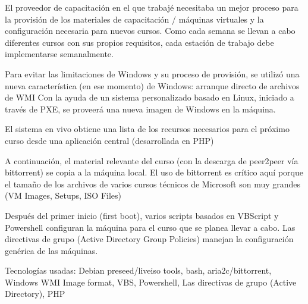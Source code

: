 \begin{cventries}
    {}
    {}
    {
      \begin{cvitems}
      \item  El proveedor de capacitación en el que trabajé necesitaba un mejor proceso para la provisión de
 los materiales de capacitación / máquinas virtuales y la configuración necesaria para nuevos
 cursos. Como cada semana se llevan a cabo diferentes cursos con sus propios requisitos, cada
 estación de trabajo debe implementarse semanalmente.
 \item  Para evitar las limitaciones de Windows y su proceso de provisión, se utilizó una nueva
 característica (en ese momento) de Windows: arranque directo de archivos de WMI
 Con la ayuda de un sistema personalizado basado en Linux, iniciado a través de PXE, se proveerá una nueva imagen de Windows en la máquina.
 \item El sistema en vivo obtiene una lista de los recursos necesarios para el próximo curso desde una aplicación central (desarrollada en PHP)
 \item A continuación, el material relevante del curso (con la descarga de peer2peer vía bittorrent) se
 copia a la máquina local. El uso de bittorrent es crítico aquí porque el tamaño de los archivos de
 varios cursos técnicos de Microsoft son muy grandes (VM Images, Setups, ISO Files)
 \item Después del primer inicio (first boot), varios scripts basados en VBScript y Powershell configuran
 la máquina para el curso que se planea llevar a cabo. Las directivas de grupo (Active Directory
 Group Policies) manejan la configuración genérica de las máquinas.
 \item Tecnologías usadas: Debian preseed/liveiso tools, bash, aria2c/bittorrent, Windows WMI Image
   format, VBS, Powershell, Las directivas de grupo (Active Directory), PHP

      \end{cvitems}
    }
\end{cventries}
\clearpage
{}
